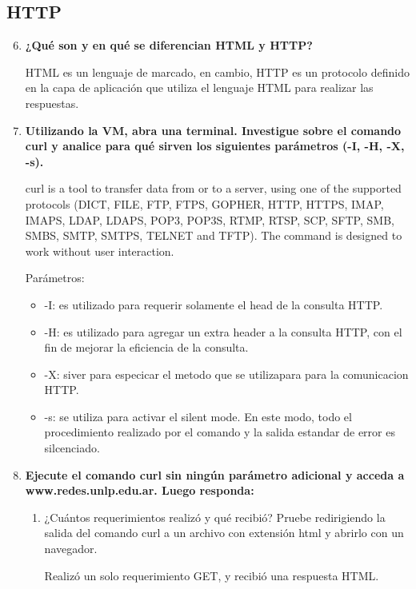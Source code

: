 \documentclass[a4paper,10pt]{article}
\begin{document}
\subsection{HTTP}
\begin{enumerate}
    \setcounter{enumi}{5}
    \item \textbf{¿Qué son y en qué se diferencian HTML y HTTP?}
    
    HTML es un lenguaje de marcado, en cambio, HTTP es un protocolo definido en la capa de aplicación que utiliza el lenguaje HTML para realizar las respuestas.
    
    \item \textbf{Utilizando la VM, abra una terminal. Investigue sobre el comando curl y analice para qué sirven los siguientes parámetros (-I, -H, -X, -s).}
    
    curl  is  a  tool  to  transfer  data from or to a server, using one of the supported protocols (DICT, FILE, FTP, FTPS, GOPHER, HTTP, HTTPS, IMAP, IMAPS, LDAP, LDAPS, POP3, POP3S, RTMP, RTSP, SCP,  SFTP,  SMB,  SMBS, SMTP, SMTPS, TELNET and TFTP). The command is designed to work without user interaction.
    
    Parámetros:
        \begin{itemize}
            \item -I: es utilizado para requerir solamente el head de la consulta HTTP.
            \item -H: es utilizado para agregar un extra header a la consulta HTTP, con el fin de mejorar la eficiencia de la consulta.
            \item -X: siver para especicar el metodo que se utilizapara para la comunicacion HTTP.
            \item -s: se utiliza para activar el silent mode. En este modo, todo el procedimiento realizado por el comando y la salida estandar de error es silcenciado.
        \end{itemize}

    \item \textbf{Ejecute el comando curl sin ningún parámetro adicional y acceda a www.redes.unlp.edu.ar.
    Luego responda:}
    
        \begin{enumerate}
            \item ¿Cuántos requerimientos realizó y qué recibió? Pruebe redirigiendo la salida del comando curl a un archivo con extensión html y abrirlo con un navegador.
            
            Realizó un solo requerimiento GET, y recibió una respuesta HTML.
            

\end{enumerate}
\end{enumerate}
\end{document}
